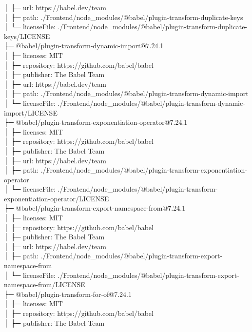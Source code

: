 │  ├─ url: https://babel.dev/team\\
│  ├─ path: ./Frontend/node\_modules/@babel/plugin-transform-duplicate-keys\\
│  └─ licenseFile: ./Frontend/node\_modules/@babel/plugin-transform-duplicate-keys/LICENSE\\
├─ @babel/plugin-transform-dynamic-import@7.24.1\\
│  ├─ licenses: MIT\\
│  ├─ repository: https://github.com/babel/babel\\
│  ├─ publisher: The Babel Team\\
│  ├─ url: https://babel.dev/team\\
│  ├─ path: ./Frontend/node\_modules/@babel/plugin-transform-dynamic-import\\
│  └─ licenseFile: ./Frontend/node\_modules/@babel/plugin-transform-dynamic-import/LICENSE\\
├─ @babel/plugin-transform-exponentiation-operator@7.24.1\\
│  ├─ licenses: MIT\\
│  ├─ repository: https://github.com/babel/babel\\
│  ├─ publisher: The Babel Team\\
│  ├─ url: https://babel.dev/team\\
│  ├─ path: ./Frontend/node\_modules/@babel/plugin-transform-exponentiation-operator\\
│  └─ licenseFile: ./Frontend/node\_modules/@babel/plugin-transform-exponentiation-operator/LICENSE\\
├─ @babel/plugin-transform-export-namespace-from@7.24.1\\
│  ├─ licenses: MIT\\
│  ├─ repository: https://github.com/babel/babel\\
│  ├─ publisher: The Babel Team\\
│  ├─ url: https://babel.dev/team\\
│  ├─ path: ./Frontend/node\_modules/@babel/plugin-transform-export-namespace-from\\
│  └─ licenseFile: ./Frontend/node\_modules/@babel/plugin-transform-export-namespace-from/LICENSE\\
├─ @babel/plugin-transform-for-of@7.24.1\\
│  ├─ licenses: MIT\\
│  ├─ repository: https://github.com/babel/babel\\
│  ├─ publisher: The Babel Team\\
